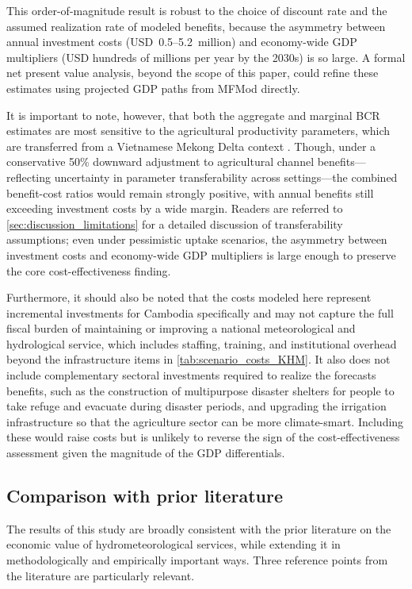\documentclass[
  final,
  10pt,
  letterpaper,
  english,
]{article}
\begin{document}
This order-of-magnitude result is robust to the choice of discount rate and the
assumed realization rate of modeled benefits, because the asymmetry between
annual investment costs (USD~0.5--5.2~million) and economy-wide GDP multipliers
(USD hundreds of millions per year by the 2030s) is so large. A formal net
present value analysis, beyond the scope of this paper, could refine these
estimates using projected GDP paths from MFMod directly.

It is important to note, however, that both the aggregate and marginal BCR
estimates are most sensitive to the agricultural productivity parameters, which
are transferred from a Vietnamese Mekong Delta context \parencite{an-vo_framework_2021}.
Though, under a conservative 50\% downward adjustment to agricultural channel
benefits—reflecting uncertainty in parameter transferability across settings—the
combined benefit-cost ratios would remain strongly positive, with annual
benefits still exceeding investment costs by a wide margin. Readers are referred
to \cref{sec:discussion_limitations} for a detailed discussion of transferability assumptions; even
under pessimistic uptake scenarios, the asymmetry between investment costs and
economy-wide GDP multipliers is large enough to preserve the core
cost-effectiveness finding.

Furthermore, it should also be noted that the costs modeled here represent
incremental investments for Cambodia specifically and may not capture the full
fiscal burden of maintaining or improving a national meteorological and
hydrological service, which includes staffing, training, and institutional
overhead beyond the infrastructure items in \cref{tab:scenario_costs_KHM}. It
also does not include complementary sectoral investments required to realize the
forecasts benefits, such as the construction of multipurpose disaster shelters
for people to take refuge and evacuate during disaster periods, and upgrading
the irrigation infrastructure so that the agriculture sector can be more
climate-smart. Including these would raise costs but is unlikely to reverse the
sign of the cost-effectiveness assessment given the magnitude of the GDP
differentials.



\subsection{Comparison with prior literature}
\label{sec:discussion_literature}

The results of this study are broadly consistent with the prior literature on
the economic value of hydrometeorological services, while extending it in
methodologically and empirically important ways. Three reference points from the
literature are particularly relevant.
\end{document}
